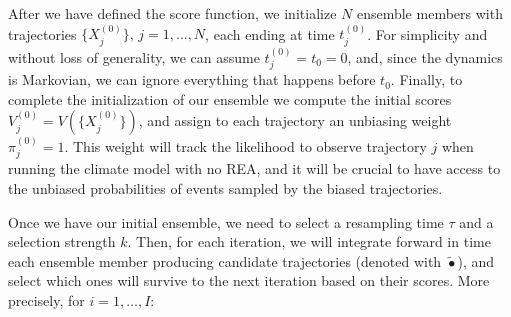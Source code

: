 After we have defined the score function, we initialize $N$ ensemble members with trajectories $\{X^{(0)}_j\}, \, j = 1, \ldots, N$, each ending at time $t^{(0)}_j$. For simplicity and without loss of generality, we can assume $t^{(0)}_j = t_0 = 0$, and,
since the dynamics is Markovian, we can ignore everything that happens before $t_0$.
Finally, to complete the initialization of our ensemble we compute the initial scores $V_j^{(0)} = V(\{X^{(0)}_j\})$, and assign to each trajectory an unbiasing weight $\pi_j^{(0)} = 1$. This weight will track the likelihood to observe trajectory $j$ when running the climate model with no REA, and it will be crucial to have access to the unbiased probabilities of events sampled by the biased trajectories.

Once we have our initial ensemble, we need to select a resampling time $\tau$ and a selection strength $k$. Then, for each iteration, we will integrate forward in time each ensemble member producing candidate trajectories (denoted with $\tilde{\bullet}$), and select which ones will survive to the next iteration based on their scores. More precisely, for $i = 1, \ldots, I$:

